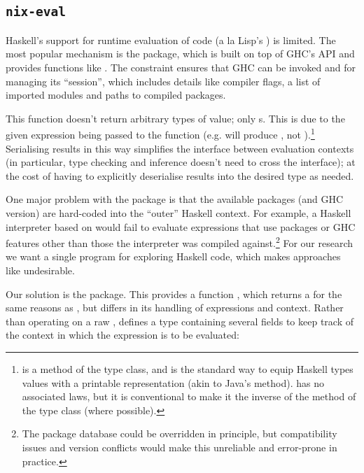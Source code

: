 \subsection{\texttt{nix-eval}}

Haskell's support for runtime evaluation of code (a la Lisp's \eval) is
limited. The most popular mechanism is the \hint package, which is built
on top of GHC's API and provides functions like
. The 
constraint ensures that GHC can be invoked and for managing its ``session'',
which includes details like compiler flags, a list of imported modules and paths
to compiled packages.

This function doesn't return arbitrary types of value; only s. This
is due to the given expression being passed to the  function (e.g.
 will produce , not
).\footnote{ is a method of the
   type class, and is the standard way to equip Haskell types values
  with a printable representation (akin to Java's  method).
   has no associated laws, but it is conventional to make it the
  inverse of the  method of the  type
  class (where possible).} Serialising results in this way simplifies the
interface between evaluation contexts (in particular, type checking and
inference doesn't need to cross the interface); at the cost of having to
explicitly deserialise results into the desired type as needed.

One major problem with the \hint package is that the available packages
(and GHC version) are hard-coded into the ``outer'' Haskell context. For
example, a Haskell interpreter based on \hint would fail to evaluate
expressions that use packages or GHC features other than those the interpreter
was compiled against.\footnote{The package database could be overridden in
  principle, but compatibility issues and version conflicts would make this
  unreliable and error-prone in practice.} For our research we want a single
program for exploring  Haskell code, which makes approaches like
\hint undesirable.

Our solution is the \nixeval package. This provides a function
, which returns a  for the same
reasons as \hint, but differs in its handling of expressions and context. Rather
than operating on a raw , \nixeval defines a type 
containing several fields to keep track of the context in which the expression
is to be evaluated:

